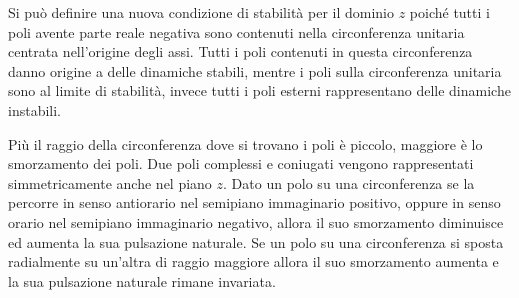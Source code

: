 \documentclass{article}
\numberwithin{equation}{subsection}
\begin{document}
Si può definire una nuova condizione di stabilità per il dominio $z$ poiché tutti i poli avente parte reale negativa sono contenuti nella circonferenza 
unitaria centrata nell'origine degli assi. Tutti i poli contenuti in questa circonferenza danno origine a delle dinamiche stabili, mentre i poli sulla circonferenza unitaria 
sono al limite di stabilità, invece tutti i poli esterni rappresentano delle dinamiche instabili. 

\begin{figure}[H]%
    \centering
    \qquad
\end{figure}

Più il raggio della circonferenza dove si trovano i poli è piccolo, maggiore è lo smorzamento dei poli. Due poli complessi e coniugati vengono rappresentati simmetricamente 
anche nel piano $z$. Dato un polo su una circonferenza se la percorre in senso antiorario nel semipiano immaginario positivo, oppure in senso orario nel semipiano immaginario 
negativo, allora il suo smorzamento diminuisce ed aumenta la sua pulsazione naturale. Se un polo su una circonferenza si sposta radialmente su un'altra di raggio maggiore 
allora il suo smorzamento aumenta e la sua pulsazione naturale rimane invariata.  
\end{document}
